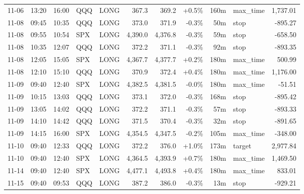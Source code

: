 \documentclass[11pt,a4paper,twoside]{article}
\begin{document}
\begin{center}
\begin{longtable}{>{\color{txtmain}}l l l l l r r r r >{\color{txtmain}}l r}
11-06 & 13:20 & 16:00 & QQQ & LONG & 367.3 & 369.2 & \textcolor{wingreen}{+0.5\%} & 160m & max\_time & \textcolor{wingreen}{1,737.01} \\
11-08 & 09:45 & 10:35 & QQQ & LONG & 373.0 & 371.9 & \textcolor{lossred}{-0.3\%} & 50m & stop & \textcolor{lossred}{-895.27} \\
11-08 & 09:55 & 10:54 & SPX & LONG & 4,390.0 & 4,376.8 & \textcolor{lossred}{-0.3\%} & 59m & stop & \textcolor{lossred}{-658.50} \\
11-08 & 10:35 & 12:07 & QQQ & LONG & 372.2 & 371.1 & \textcolor{lossred}{-0.3\%} & 92m & stop & \textcolor{lossred}{-893.35} \\
11-08 & 12:05 & 15:05 & SPX & LONG & 4,367.7 & 4,377.7 & \textcolor{wingreen}{+0.2\%} & 180m & max\_time & \textcolor{wingreen}{500.99} \\
11-08 & 12:10 & 15:10 & QQQ & LONG & 370.9 & 372.4 & \textcolor{wingreen}{+0.4\%} & 180m & max\_time & \textcolor{wingreen}{1,176.00} \\
11-09 & 09:40 & 12:40 & SPX & LONG & 4,382.5 & 4,381.5 & \textcolor{lossred}{-0.0\%} & 180m & max\_time & \textcolor{lossred}{-51.51} \\
11-09 & 10:15 & 13:03 & QQQ & LONG & 373.1 & 372.0 & \textcolor{lossred}{-0.3\%} & 168m & stop & \textcolor{lossred}{-895.42} \\
11-09 & 13:05 & 14:02 & QQQ & LONG & 372.2 & 371.1 & \textcolor{lossred}{-0.3\%} & 57m & stop & \textcolor{lossred}{-893.33} \\
11-09 & 14:10 & 14:42 & QQQ & LONG & 371.5 & 370.4 & \textcolor{lossred}{-0.3\%} & 32m & stop & \textcolor{lossred}{-891.65} \\
11-09 & 14:15 & 16:00 & SPX & LONG & 4,354.5 & 4,347.5 & \textcolor{lossred}{-0.2\%} & 105m & max\_time & \textcolor{lossred}{-348.00} \\
11-10 & 09:40 & 12:33 & QQQ & LONG & 372.2 & 376.0 & \textcolor{wingreen}{+1.0\%} & 173m & target & \textcolor{wingreen}{2,977.84} \\
11-10 & 09:40 & 12:40 & SPX & LONG & 4,364.5 & 4,393.9 & \textcolor{wingreen}{+0.7\%} & 180m & max\_time & \textcolor{wingreen}{1,469.50} \\
11-14 & 09:40 & 12:40 & SPX & LONG & 4,477.1 & 4,493.8 & \textcolor{wingreen}{+0.4\%} & 180m & max\_time & \textcolor{wingreen}{833.01} \\
11-15 & 09:40 & 09:53 & QQQ & LONG & 387.2 & 386.0 & \textcolor{lossred}{-0.3\%} & 13m & stop & \textcolor{lossred}{-929.21} \\

\end{longtable}
\end{center}
\end{document}
